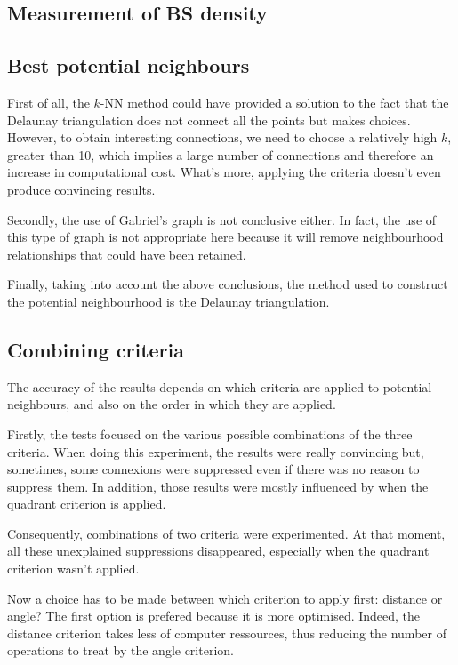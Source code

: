 \documentclass[lettersize,journal,english]{IEEEtran}
\begin{document}
    \subsection{Measurement of BS density}

    \subsection{Best potential neighbours}
        First of all, the $k$-NN method could have provided a solution to the fact that the Delaunay triangulation does not connect all the points but makes choices. However, to obtain interesting connections, we need to choose a relatively high $k$, greater than 10, which implies a large number of connections and therefore an increase in   computational cost. What's more, applying the criteria doesn't even produce convincing results.
        
        Secondly, the use of Gabriel's graph is not conclusive either. In fact, the use of this type of graph is not appropriate here because it will remove neighbourhood relationships that could have been retained.

        Finally, taking into account the above conclusions, the method used to construct the potential neighbourhood is the Delaunay triangulation.
        
    \subsection{Combining criteria}
        The accuracy of the results depends on which criteria are applied to potential neighbours, and also on the order in which they are applied.

        Firstly, the tests focused on the various possible combinations of the three criteria. When doing this experiment, the results were really convincing but, sometimes, some connexions were suppressed even if there was no reason to suppress them. In addition, those results were mostly influenced by when the quadrant criterion is applied.

        Consequently, combinations of two criteria were experimented. At that moment, all these unexplained suppressions disappeared, especially when the quadrant criterion wasn't applied.

        Now a choice has to be made between which criterion to apply first: distance or angle? The first option is prefered because it is more optimised. Indeed, the distance criterion takes less of computer ressources, thus reducing the number of operations to treat by the angle criterion.
\end{document}
